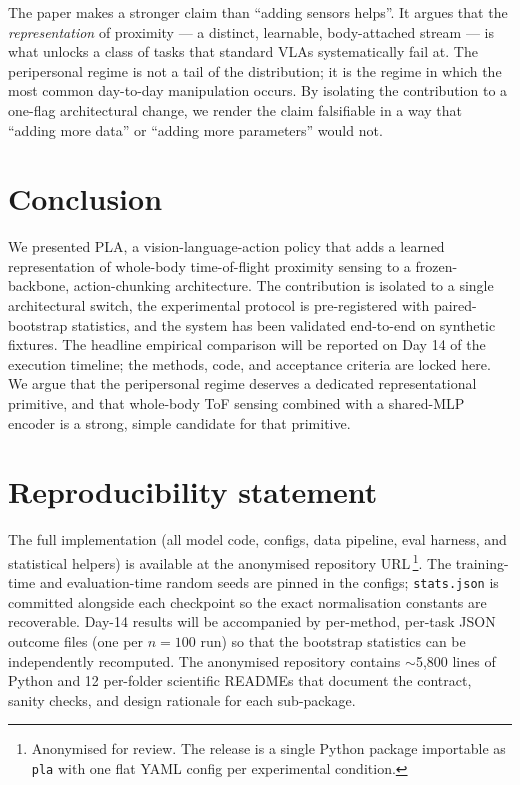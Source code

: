 \documentclass[11pt]{article}
\begin{document}
The paper makes a stronger claim than ``adding sensors helps''. It
argues that the \emph{representation} of proximity --- a distinct,
learnable, body-attached stream --- is what unlocks a class of tasks
that standard VLAs systematically fail at. The peripersonal regime is
not a tail of the distribution; it is the regime in which the most
common day-to-day manipulation occurs. By isolating the contribution to
a one-flag architectural change, we render the claim falsifiable in a
way that ``adding more data'' or ``adding more parameters'' would not.

\section{Conclusion}
\label{sec:conclusion}

We presented PLA, a vision-language-action policy that adds a learned
representation of whole-body time-of-flight proximity sensing to a
frozen-backbone, action-chunking architecture. The contribution is
isolated to a single architectural switch, the experimental protocol is
pre-registered with paired-bootstrap statistics, and the system has
been validated end-to-end on synthetic fixtures. The headline empirical
comparison will be reported on Day 14 of the execution timeline; the
methods, code, and acceptance criteria are locked here. We argue that
the peripersonal regime deserves a dedicated representational primitive,
and that whole-body ToF sensing combined with a shared-MLP encoder is a
strong, simple candidate for that primitive.

\section*{Reproducibility statement}

The full implementation (all model code, configs, data pipeline, eval
harness, and statistical helpers) is available at the anonymised
repository
URL\,\footnote{Anonymised for review. The release is a single Python
package importable as \texttt{pla} with one flat YAML config per
experimental condition.}.
The training-time and evaluation-time random seeds are pinned in the
configs; \texttt{stats.json} is committed alongside each checkpoint so
the exact normalisation constants are recoverable. Day-14 results will
be accompanied by per-method, per-task JSON outcome files (one per
$n=100$ run) so that the bootstrap statistics can be independently
recomputed. The anonymised repository contains
$\sim$5{,}800 lines of Python and 12 per-folder scientific READMEs that
document the contract, sanity checks, and design rationale for each
sub-package.
\end{document}
